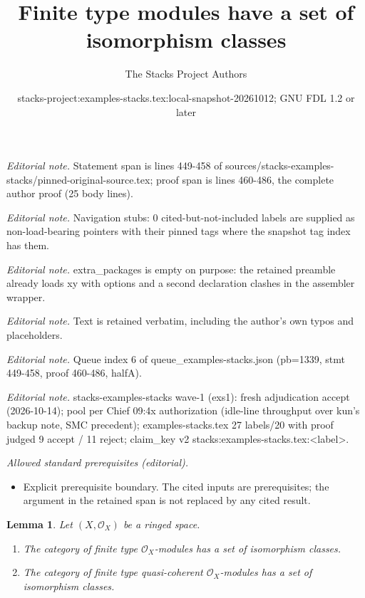 \documentclass[10pt,a4paper]{amsart}
\title{Finite type modules have a set of isomorphism classes}
\author{The Stacks Project Authors}
\date{stacks-project:examples-stacks.tex:local-snapshot-20261012; GNU FDL 1.2 or later}
\theoremstyle{plain}
\newtheorem{lemma}[subsection]{Lemma}
\theoremstyle{definition}
\theoremstyle{remark}
\numberwithin{equation}{subsection}
\begin{document}
\maketitle
\noindent\textit{Editorial note.} Statement span is lines 449-458 of sources/stacks-examples-stacks/pinned-original-source.tex; proof span is lines 460-486, the complete author proof (25 body lines).\par\medskip
\noindent\textit{Editorial note.} Navigation stubs: 0 cited-but-not-included labels are supplied as non-load-bearing pointers with their pinned tags where the snapshot tag index has them.\par\medskip
\noindent\textit{Editorial note.} extra\_packages is empty on purpose: the retained preamble already loads xy with options and a second declaration clashes in the assembler wrapper.\par\medskip
\noindent\textit{Editorial note.} Text is retained verbatim, including the author's own typos and placeholders.\par\medskip
\noindent\textit{Editorial note.} Queue index 6 of queue\_examples-stacks.json (pb=1339, stmt 449-458, proof 460-486, halfA).\par\medskip
\noindent\textit{Editorial note.} stacks-examples-stacks wave-1 (exs1): fresh adjudication accept (2026-10-14); pool per Chief 09:4x authorization (idle-line throughput over kun's backup note, SMC precedent); examples-stacks.tex 27 labels/20 with proof judged 9 accept / 11 reject; claim\_key v2 stacks:examples-stacks.tex:<label>.\par\medskip
\noindent\textit{Allowed standard prerequisites (editorial).}\begin{itemize}
\item Explicit prerequisite boundary. The cited inputs are prerequisites; the argument in the retained span is not replaced by any cited result.
\end{itemize}\medskip
\begin{lemma}
\label{lemma-finite-type}
Let $(X, \mathcal{O}_X)$ be a ringed space.
\begin{enumerate}
\item The category of finite type $\mathcal{O}_X$-modules has a
set of isomorphism classes.
\item The category of finite type quasi-coherent
$\mathcal{O}_X$-modules has a set of isomorphism classes.
\end{enumerate}
\end{lemma}
\end{document}
